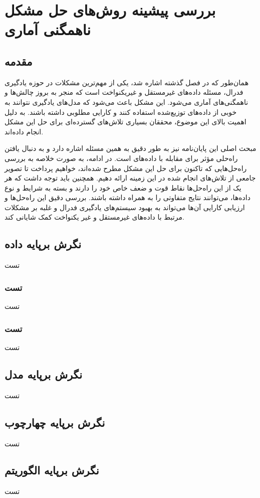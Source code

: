 \chapter{بررسی پیشینه روش‌های حل مشکل ناهمگنی آماری}

\section{مقدمه}



همان‌طور که در فصل گذشته اشاره شد، یکی از مهم‌ترین مشکلات در حوزه یادگیری فدرال، مسئله داده‌های غیرمستقل و غیریکنواخت
است که منجر به بروز چالش‌ها و ناهمگنی‌های آماری می‌شود. این مشکل باعث می‌شود که مدل‌های یادگیری نتوانند به خوبی از داده‌های توزیع‌شده استفاده کنند و کارایی مطلوبی داشته باشند. به دلیل اهمیت بالای این موضوع، محققان بسیاری تلاش‌های گسترده‌ای برای حل این مشکل انجام داده‌اند.

مبحث اصلی این پایان‌نامه نیز به طور دقیق به همین مسئله اشاره دارد و به دنبال یافتن راه‌حلی مؤثر برای مقابله با داده‌های
است. در ادامه، به صورت خلاصه به بررسی راه‌حل‌هایی که تاکنون برای حل این مشکل مطرح شده‌اند، خواهیم پرداخت تا تصویر جامعی از تلاش‌های انجام شده در این زمینه ارائه دهیم. همچنین باید توجه داشت که هر یک از این راه‌حل‌ها نقاط قوت و ضعف خاص خود را دارند و بسته به شرایط و نوع داده‌ها، می‌توانند نتایج متفاوتی را به همراه داشته باشند. بررسی دقیق این راه‌حل‌ها و ارزیابی کارایی آن‌ها می‌تواند به بهبود سیستم‌های یادگیری فدرال و غلبه بر مشکلات مرتبط با داده‌های غیرمستقل و غیر یکنواخت کمک شایانی کند.


\section{نگرش برپایه داده}
تست

\subsection{تست}
تست

\subsection{تست}
تست



\section{نگرش برپایه مدل}
تست


\section{نگرش برپایه چهارچوب}
تست


\section{نگرش برپایه الگوریتم}
تست
